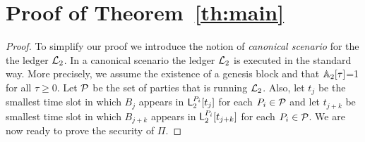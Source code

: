 \section{Proof of Theorem~\ref{th:main}}\label{se:proof}
\begin{proof}
To simplify our proof we introduce the notion of \emph{canonical scenario} for the the ledger $\mathcal{L}_2$. In a canonical scenario the ledger
$\mathcal{L}_2$ is executed in the standard way. More precisely, 
we assume the existence of a genesis block and that $\mathbb{A}_2[\tau]$=1 for all $\tau \geq 0$. Let $\mathcal{P}$ be the set of parties that is running $\mathcal{L}_2$. Also, 
let $t_j$ be the smallest time slot in which $B_j$ appears in  $\mathsf{L}_2^{P_i}[t_j]$ for each $P_i\in\mathcal{P}$ and let $t_{j+k}$ be smallest time slot in which $B_{j+k}$ appears in %
$\mathsf{L}_2^{P_i}[t_{j+k}]$ for each $P_i\in\mathcal{P}$.
We are now ready to prove the security of $\Pi$.


\end{proof}
